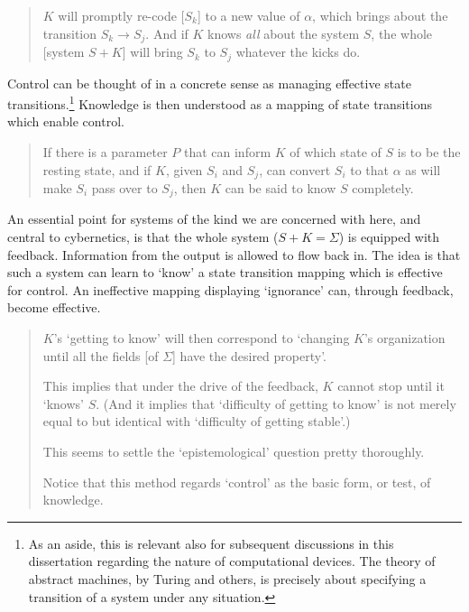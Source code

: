\documentclass[11pt, oneside]{article}   	%
\begin{document}
\begin{quote}
$K$ will promptly re-code [$S_k$] to a new value of $\alpha$, which brings about the transition $S_k \rightarrow S_j$.  And if $K$ knows \emph{all} about the system $S$, the whole [system $S + K$] will bring $S_k$ to $S_j$ whatever the kicks do.  \cite[p. 4293]{AshbyJournal}
\end{quote}

Control can be thought of in a concrete sense as managing effective state transitions.\footnote{As an aside, this is relevant also for subsequent discussions in this dissertation regarding the nature of computational devices.  The theory of abstract machines, by Turing and others, is precisely about specifying a transition of a system under any situation.}  Knowledge is then understood as a mapping of state transitions which enable control.

\begin{quote}
If there is a parameter $P$ that can inform $K$ of which state of $S$ is to be the resting state, and if $K$, given $S_i$ and $S_j$, can convert $S_i$ to that $\alpha$ as will make $S_i$ pass over to $S_j$, then $K$ can be said to know $S$ completely.  \cite[p. 4293]{AshbyJournal}
\end{quote}

An essential point for systems of the kind we are concerned with here, and central to cybernetics, is that the whole system ($S + K = \Sigma$) is equipped with feedback.  Information from the output is allowed to flow back in.  The idea is that such a system can learn to `know' a state transition mapping which is effective for control.  An ineffective mapping displaying `ignorance' can, through feedback, become effective.

\begin{quote}
$K$'s `getting to know' will then correspond to `changing $K$'s organization until all the fields [of $\Sigma$] have the desired property'.

This implies that under the drive of the feedback, $K$ cannot stop until it `knows' $S$.  (And it implies that `difficulty of getting to know' is not merely equal to but identical with `difficulty of getting stable'.)

This seems to settle the `epistemological' question pretty thoroughly.

Notice that this method regards `control' as the basic form, or test, of knowledge.  \cite[p. 4293]{AshbyJournal}
\end{quote}
\end{document}
